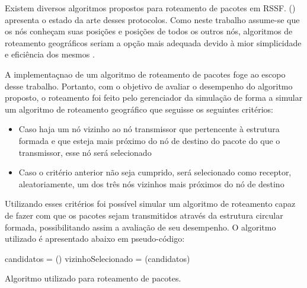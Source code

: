 Existem diversos algoritmos propostos para roteamento de pacotes em RSSF.  (\citeyear{Al-karaki04routingtechniques}) apresenta o estado da arte desses protocolos. Como  neste trabalho assume-se que os nós conheçam suas posições e posições de todos os outros nós, algoritmos de roteamento geográficos seriam a opção mais adequada devido à mior simplicidade e eficiência dos mesmos \cite{Pal2010}.  

A implementaçnao de um algoritmo de roteamento de pacotes foge ao escopo desse trabalho. Portanto, com o objetivo de avaliar o desempenho do algoritmo proposto, o roteamento foi feito pelo gerenciador da simulação de forma a simular um algoritmo de roteamento geográfico que seguisse os seguintes critérios:

\begin{itemize}
\item Caso haja um nó vizinho ao nó transmissor que pertencente à estrutura formada e que esteja mais próximo do nó de destino do pacote do que o transmissor, esse nó será selecionado
\item Caso o critério anterior não seja cumprido, será selecionado como receptor, aleatoriamente, um dos três nós vizinhos mais próximos do nó de destino
\end{itemize}

Utilizando esses critérios foi possível simular um algoritmo de roteamento capaz de fazer com que os pacotes sejam transmitidos através da estrutura circular formada, possibilitando assim a avaliação de seu desempenho. O algoritmo utilizado é apresentado abaixo em pseudo-código:

\begin{algorithm}[H]
	

	candidatos = \encontreOsTresVizinhosMaisProximos()\;
	vizinhoSelecionado = \selecioneAleatoriamente(candidatos)\;
	
	\Retorna{[vizinhoSelecionado]}
	
\caption{Algoritmo utilizado para roteamento de pacotes.}
\end{algorithm}